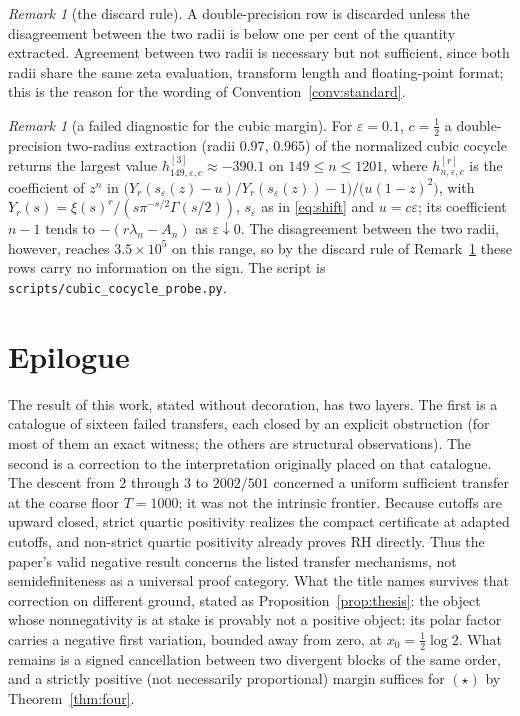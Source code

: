 \documentclass[11pt]{amsart}
\theoremstyle{definition}
\theoremstyle{remark}
\newtheorem{remark}[theorem]{Remark}
\theoremstyle{definition}
\newcommand{\eps}{\varepsilon}
\begin{document}
\begin{remark}[the discard rule]\label{rmk:guard}
A double-precision row is discarded unless the disagreement between the two radii is below one per
cent of the quantity extracted. Agreement between two radii is necessary but not sufficient, since
both radii share the same zeta evaluation, transform length and floating-point format; this is the
reason for the wording of Convention~\ref{conv:standard}.
\end{remark}

\begin{remark}[a failed diagnostic for the cubic margin]\label{rmk:diag-cubic}
For $\eps=0.1$, $c=\tfrac12$ a double-precision two-radius extraction (radii $0.97$, $0.965$) of
the normalized cubic cocycle returns the largest value $h^{[3]}_{149,\eps,c}\approx-390.1$ on
$149\le n\le1201$, where $h^{[r]}_{n,\eps,c}$ is the coefficient of $z^n$ in
$\bigl(Y_r(s_\eps(z)-u)/Y_r(s_\eps(z))-1\bigr)/\bigl(u(1-z)^2\bigr)$, with
$Y_r(s)=\xi(s)^r/(s\pi^{-s/2}\Gamma(s/2))$, $s_\eps$ as in \eqref{eq:shift}
and $u=c\eps$; its coefficient $n-1$ tends to $-(r\lambda_n-A_n)$ as $\eps\downarrow0$. The disagreement between the two radii, however, reaches $3.5\times10^{5}$ on
this range, so by the discard rule of Remark~\ref{rmk:guard} these rows carry no information on
the sign. The script is \texttt{scripts/cubic\_cocycle\_probe.py}.
\end{remark}

\section{Epilogue}\label{sec:epilogue}

The result of this work, stated without decoration, has two layers.  The first is a catalogue of
sixteen failed transfers, each closed by an explicit obstruction (for most of them an exact
witness; the others are structural observations).  The second is a correction to the
interpretation originally placed on that catalogue.  The descent from $2$ through $3$ to
$2002/501$ concerned a uniform sufficient transfer at the coarse floor $T=1000$; it was not the
intrinsic frontier.  Because cutoffs are upward closed, strict quartic positivity realizes the
compact certificate at adapted cutoffs, and non-strict quartic positivity already proves RH
directly.  Thus the paper's valid negative result concerns the listed transfer mechanisms, not
semidefiniteness as a universal proof category.  What the title names survives that correction on
different ground, stated as Proposition~\ref{prop:thesis}: the object whose nonnegativity is at
stake is provably not a positive object: its polar factor carries a negative first variation,
bounded away from zero, at $x_0=\tfrac12\log2$. What remains is a signed cancellation between two
divergent blocks of the same order, and a strictly positive (not necessarily proportional) margin suffices for $(\star)$ by
Theorem~\ref{thm:four}.
\end{document}
